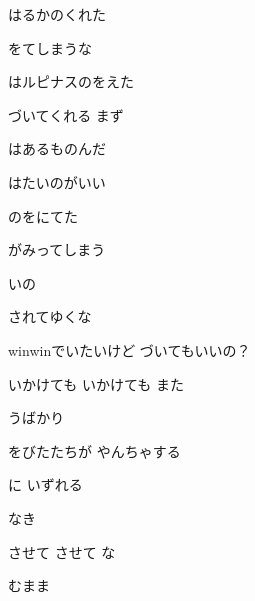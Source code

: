 \documentclass[a4paper,tate,twocolumn,12pt]{ltjtarticle}
\begin{document}
\thispagestyle{empty}

\begin{center}
{\LARGE {}}
\end{center}

\vspace{1em}

\begin{flushleft}

\noindent\begin{minipage}{\linewidth}
はるかのくれた

をてしまうな

はルピナスのをえた

づいてくれる まず

はあるものんだ

はたいのがいい

のをにてた

がみってしまう
\end{minipage}

\vspace{2em}

\noindent\begin{minipage}{\linewidth}
いの

されてゆくな

winwinでいたいけど づいてもいいの？

いかけても いかけても また

 うばかり

をびたたちが やんちゃする

に いずれる

なき

させて させて な

 むまま
\end{minipage}


\end{flushleft}
\end{document}
